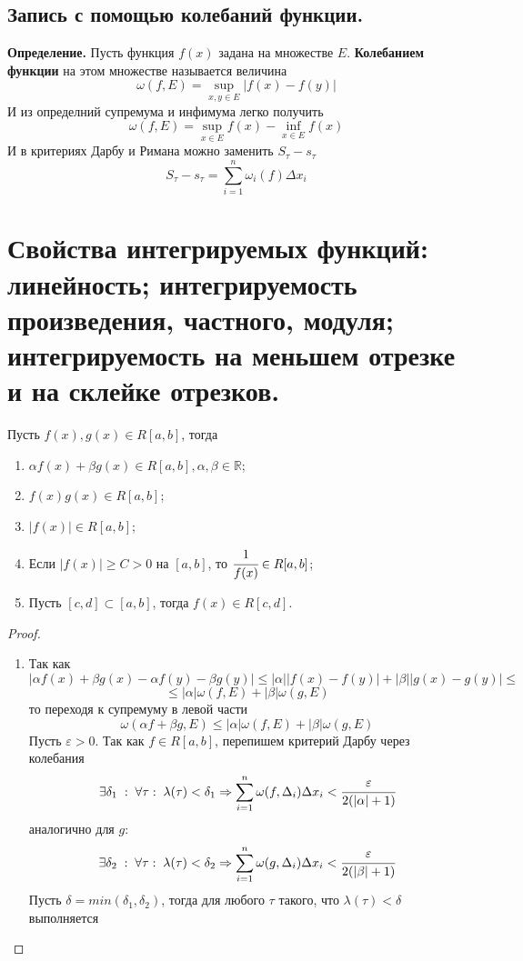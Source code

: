 \documentclass{article}
\newcommand*{\definition}[1]{\textbf{Определение.} #1 \newline}
\newcommand*{\R}{\mathbb{R}}
\begin{document}
\subsection{Запись с помощью колебаний функции.}
\definition{Пусть функция $f(x)$ задана на множестве $E$. \textbf{Колебанием функции} на этом множестве называется величина}
$$
    \omega(f, E) = \displaystyle \sup_{x, y \in E}|f(x) - f(y)|
$$
И из определний супремума и инфимума легко получить 
$$
    \omega(f, E) = \displaystyle \sup_{x \in E}f(x) - \inf_{x \in E}f(x)
$$
И в критериях Дарбу и Римана можно заменить $S_\tau - s_\tau$
$$
    S_\tau - s_\tau = \sum_{i = 1}^{n}\omega_i(f)\Delta x_i
$$
\section{Свойства интегрируемых функций: линейность; интегрируемость произведения, частного, модуля; интегрируемость на меньшем отрезке и на склейке отрезков.}
Пусть $f(x), g(x) \in R[a, b]$, тогда 
\begin{enumerate}
    \item $\alpha f(x) + \beta g(x) \in R[a, b], \alpha, \beta \in \R$;
    \item $f(x)g(x) \in R[a, b]$;
    \item $|f(x)| \in R[a, b]$;
    \item Если $|f(x)| \geq C > 0$ на $[a, b]$, то $\cfrac{1}{f(x)} \in R[a, b]$;
    \item Пусть $[c, d] \subset [a, b]$, тогда $f(x) \in R[c, d]$.
\end{enumerate}
\begin{proof}
    \begin{enumerate}
        \item Так как
        $$
            |\alpha f(x) + \beta g(x) - \alpha f(y) - \beta g(y)| \leq |\alpha||f(x) - f(y)| + |\beta||g(x) - g(y)| \leq 
        $$  
        $$
            \leq |\alpha|\omega(f, E) + |\beta|\omega(g, E)
        $$
        то переходя к супремуму в левой части
        $$
            \omega(\alpha f + \beta g, E) \leq |\alpha|\omega(f, E) + |\beta|\omega(g, E)
        $$
        Пусть $\varepsilon > 0$. Так как $f \in R[a, b]$, перепишем критерий Дарбу через колебания
        $$
            \exists \delta_1 \; : \; \forall \tau: \; \lambda(\tau) < \delta_1 \Rightarrow \sum_{i = 1}^{n} \omega(f, \Delta_i)\Delta x_i < \cfrac{\varepsilon}{2(|\alpha| + 1)}        
        $$
        аналогично для $g$:
        $$
            \exists \delta_2 \; : \; \forall \tau: \; \lambda(\tau) < \delta_2 \Rightarrow \sum_{i = 1}^{n} \omega(g, \Delta_i)\Delta x_i < \cfrac{\varepsilon}{2(|\beta| + 1)}        
        $$  
        Пусть $\delta = min(\delta_1, \delta_2)$, тогда для любого $\tau$ такого, что $\lambda(\tau) < \delta$ выполняется
    \end{enumerate}
\end{proof}
\end{document}
